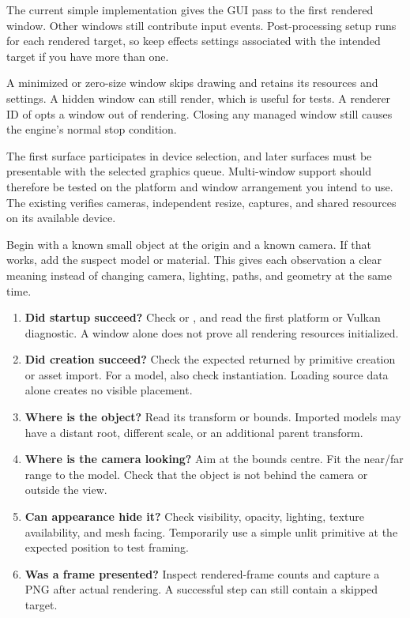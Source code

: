 \documentclass[11pt,a4paper]{article}
\begin{document}
The current simple implementation gives the GUI pass to the first rendered window. Other windows still contribute input events. Post-processing setup runs for each rendered target, so keep effects settings associated with the intended target if you have more than one.

A minimized or zero-size window skips drawing and retains its resources and settings. A hidden window can still render, which is useful for tests. A renderer ID of  opts a window out of rendering. Closing any managed window still causes the engine's normal stop condition.

The first surface participates in device selection, and later surfaces must be presentable with the selected graphics queue. Multi-window support should therefore be tested on the platform and window arrangement you intend to use. The existing  verifies cameras, independent resize, captures, and shared resources on its available device.

Begin with a known small object at the origin and a known camera. If that works, add the suspect model or material. This gives each observation a clear meaning instead of changing camera, lighting, paths, and geometry at the same time.

\begin{enumerate}
\item \textbf{Did startup succeed?} Check  or , and read the first platform or Vulkan diagnostic. A window alone does not prove all rendering resources initialized.
\item \textbf{Did creation succeed?} Check the expected returned by primitive creation or asset import. For a model, also check instantiation. Loading source data alone creates no visible placement.
\item \textbf{Where is the object?} Read its transform or bounds. Imported models may have a distant root, different scale, or an additional parent transform.
\item \textbf{Where is the camera looking?} Aim at the bounds centre. Fit the near/far range to the model. Check that the object is not behind the camera or outside the view.
\item \textbf{Can appearance hide it?} Check visibility, opacity, lighting, texture availability, and mesh facing. Temporarily use a simple unlit primitive at the expected position to test framing.
\item \textbf{Was a frame presented?} Inspect rendered-frame counts and capture a PNG after actual rendering. A successful step can still contain a skipped target.
\end{enumerate}
\end{document}
